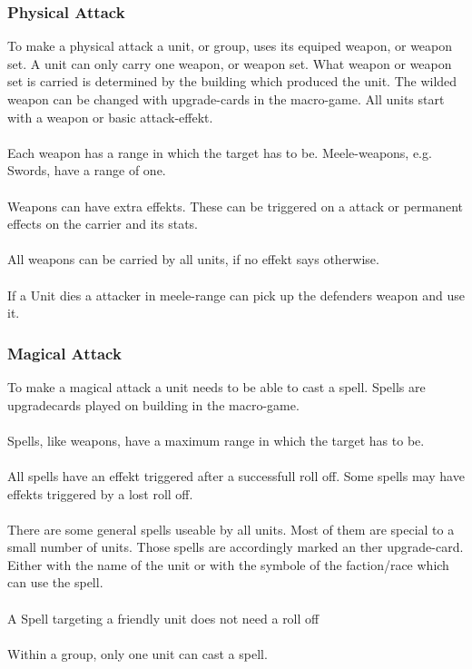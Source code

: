 \documentclass[a5paper,pagesize,10pt,bibtotoc,pointlessnumbers,
normalheadings,DIV=9,twoside=false]{scrbook}
\begin{document}
\subsubsection{Physical Attack}
To make a physical attack a unit, or group, uses its equiped weapon, or weapon set. 
A unit can only carry one weapon, or weapon set.
What weapon or weapon set is carried is determined by the building which produced the unit. The wilded weapon can be changed with upgrade-cards in the macro-game.
All units start with a weapon or basic attack-effekt.\\
\\
Each weapon has a range in which the target has to be. Meele-weapons, e.g. Swords, have a range of one.\\
\\
Weapons can have extra effekts. These can be triggered on a attack or permanent effects on the carrier and its stats.\\
\\
All weapons can be carried by all units, if no effekt says otherwise.\\
\\
If a Unit dies a attacker in meele-range can pick up the defenders weapon and use it.

\subsubsection{Magical Attack}
To make a magical attack a unit needs to be able to cast a spell. Spells are upgradecards played on building in the macro-game.\\
\\
Spells, like weapons, have a maximum range in which the target has to be.\\
\\
All spells have an effekt triggered after a successfull roll off. Some spells may have effekts triggered by a lost roll off.\\
\\
There are some general spells useable by all units. Most of them are special to a small number of units. Those spells are accordingly marked an ther upgrade-card. Either with the name of the unit or with the symbole of the faction/race which can use the spell.\\
\\
A Spell targeting a friendly unit does not need a roll off\\
\\
Within a group, only one unit can cast a spell.
\end{document}
